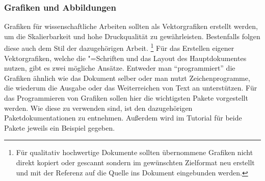 \subsubsection{Grafiken und Abbildungen}
Grafiken für wissenschaftliche Arbeiten sollten als Vektorgrafiken erstellt 
werden, um die Skalierbarkeit und hohe Druckqualität zu gewährleisten. 
Bestenfalls folgen diese auch dem Stil der dazugehörigen Arbeit.%
\footnote{%
  Für qualitativ hochwertige Dokumente sollten übernommene Grafiken nicht 
  direkt kopiert oder gescannt sondern im gewünschten Zielformat neu erstellt 
  und mit der Referenz auf die Quelle ins Dokument eingebunden werden.
}
Für das Erstellen eigener Vektorgrafiken, welche die "=Schriften 
und das Layout des Hauptdokumentes nutzen, gibt es zwei mögliche Ansätze. 
Entweder man \enquote{programmiert} die Grafiken ähnlich wie das Dokument 
selber oder man nutzt Zeichenprogramme, die wiederum die Ausgabe oder das 
Weiterreichen von Text an  unterstützen. Für das Programmieren 
von Grafiken sollen hier die wichtigsten Pakete vorgestellt werden. Wie diese 
zu verwenden sind, ist den dazugehörigen Paketdokumentationen zu entnehmen. 
Außerdem wird im Tutorial  für beide Pakete jeweils ein 
Beispiel gegeben.

